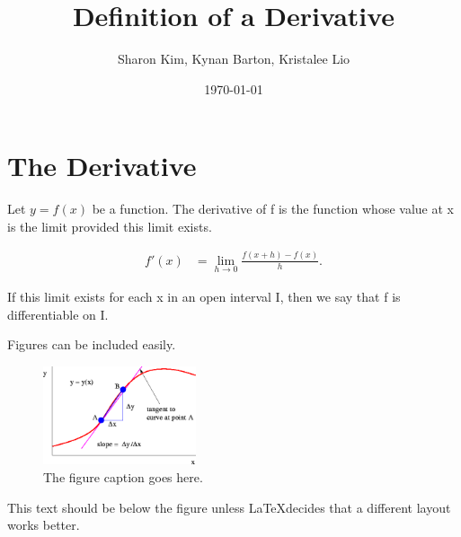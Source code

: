 \documentclass[aps,pra,notitlepage,amsmath,amssymb,letterpaper,12pt]{revtex4-1}
\begin{document}
 
\title{Definition of a Derivative}
\author{Sharon Kim, Kynan Barton, Kristalee Lio}
\date{\today}



\section{The Derivative}



Let $y = f(x)$ be a function. The derivative of f is the function whose value at x is the limit provided this limit exists.


\begin{align}
f'(x) &= \lim_{h \to 0} \frac{f(x+h)-f(x)}{h}.
\end{align}




If this limit exists for each x in an open interval I, then we say that f is differentiable on I.













Figures can be included easily.

\begin{figure}[h!] %
 \includegraphics[width=0.4\textwidth]{Introductory_Physics_fig_1_15.png}  %
  \caption{The figure caption goes here.}
  \label{fig:figlabel}
\end{figure}

This text should be below the figure unless \LaTeX  decides that a different layout works better.
 

 
\end{document}
